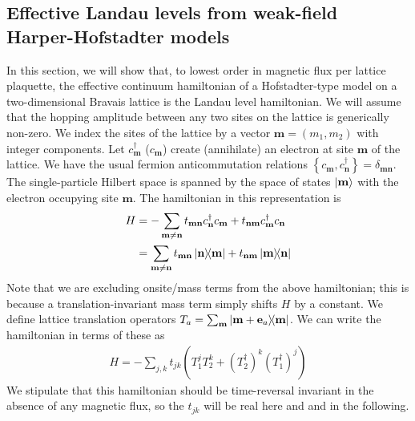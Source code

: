 \documentclass[aps,prb,twocolumn,letterpaper,twoside,nobalancelastpage,groupedaddress,amsmath,amssymb,floatfix,citeautoscript]{revtex4-1}
\begin{document}
\subsection{Effective Landau levels from weak-field Harper-Hofstadter models}
\label{landau-level-limit}
In this section, we will show that, to lowest order in magnetic flux per lattice plaquette, the effective continuum hamiltonian of a Hofstadter-type model on a two-dimensional Bravais lattice is the Landau level hamiltonian. We will assume that the hopping amplitude between any two sites on the lattice is generically non-zero. We index the sites of the lattice by a vector $\mathbf{m} = (m_1, m_2)$ with integer components. Let $c^{\dag}_{\mathbf{m}}$ ($c_{\mathbf{m}}$) create (annihilate) an electron at site $\mathbf{m}$ of the lattice. We have the usual fermion anticommutation relations $\left\{c_{\mathbf{m}},c_{\mathbf{n}}^{\dag}\right\} = \delta_{\mathbf{m} \mathbf{n}}$. The single-particle Hilbert space is spanned by the space of states $\ket{\mathbf{m}}$ with the electron occupying site $\mathbf{m}$. The hamiltonian in this representation is
\begin{align*}
H &= -\sum_{\mathbf{m}\neq \mathbf{n}} t_{\mathbf{m}\mathbf{n}} c^{\dag}_\mathbf{n} c_\mathbf{m}  + t_{\mathbf{n}\mathbf{m}} c^{\dag}_{\mathbf{m}} c_{\mathbf{n}}\\  &= \sum_{\mathbf{m}\neq \mathbf{n}} t_{\mathbf{m}\mathbf{n}} \dyad{\mathbf{n}}{\mathbf{m}} + t_{\mathbf{n}\mathbf{m}} \dyad{\mathbf{m}}{\mathbf{n}}
\end{align*}
Note that we are excluding onsite/mass terms from the above hamiltonian; this is because a translation-invariant mass term simply shifts $H$ by a constant. We define lattice translation operators $T_a = \sum_{\bfm} \dyad{\mathbf{m} + \mathbf{e}_a}{\mathbf{m}}$. We can write the hamiltonian in terms of these as
\begin{align}
\label{eq-b0-lattice-hamiltonian}
H = -\sum_{j,k} t_{jk} \left(T_1^j T_2^k + (T^{\dag}_2)^{k} (T^{\dag}_1)^{j}\right)
\end{align}
We stipulate that this hamiltonian should be time-reversal invariant in the absence of any magnetic flux, so the $t_{jk}$ will be real here and and in the following.
\end{document}
